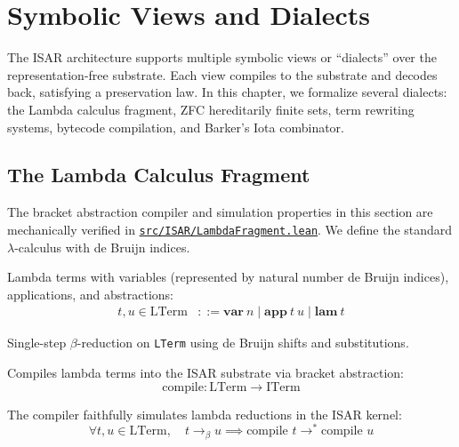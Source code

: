 \chapter{Symbolic Views and Dialects}

The ISAR architecture supports multiple symbolic views or ``dialects'' over the representation-free substrate. Each view compiles to the substrate and decodes back, satisfying a preservation law. In this chapter, we formalize several dialects: the Lambda calculus fragment, ZFC hereditarily finite sets, term rewriting systems, bytecode compilation, and Barker's Iota combinator.

\section{The Lambda Calculus Fragment}

The bracket abstraction compiler and simulation properties in this section are mechanically verified in \href{https://github.com/cypoe/isar-proofs/blob/master/src/ISAR/LambdaFragment.lean}{\texttt{src/ISAR/LambdaFragment.lean}}. We define the standard $\lambda$-calculus with de Bruijn indices.

\begin{definition}
Lambda terms with variables (represented by natural number de Bruijn indices), applications, and abstractions:
\begin{align*}
t, u \in \text{LTerm} &::= \mathbf{var}\ n \mid \mathbf{app}\ t\ u \mid \mathbf{lam}\ t
\end{align*}
\end{definition}

\begin{definition}
Single-step $\beta$-reduction on \texttt{LTerm} using de Bruijn shifts and substitutions.
\end{definition}

\begin{definition}
Compiles lambda terms into the ISAR substrate via bracket abstraction:
$$\text{compile} : \text{LTerm} \to \text{ITerm}$$
\end{definition}

\begin{theorem}
The compiler faithfully simulates lambda reductions in the ISAR kernel:
$$\forall t, u \in \text{LTerm}, \quad t \to_\beta u \implies \text{compile } t \to^* \text{compile } u$$
\end{theorem}

